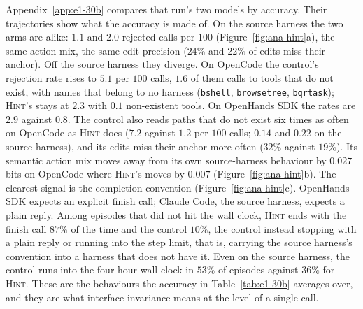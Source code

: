 \documentclass{article} %
\newcommand{\method}{\textsc{Hint}}
\newcommand{\claudecode}{Claude Code}
\newcommand{\opencode}{OpenCode}
\newcommand{\openhands}{OpenHands SDK}   %
\begin{document}
Appendix~\ref{app:e1-30b} compares that run's two models by accuracy. Their
trajectories show what the accuracy is made of. On the source harness the two
arms are alike: $1.1$ and $2.0$ rejected calls per $100$
(Figure~\ref{fig:ana-hint}a), the same action mix, the same edit precision
($24\%$ and $22\%$ of edits miss their anchor). Off the source harness they
diverge. On \opencode{} the control's rejection rate rises to $5.1$ per $100$
calls, $1.6$ of them calls to tools that do not exist, with names that belong
to no harness (\texttt{bshell}, \texttt{browsetree}, \texttt{bqrtask});
\method{}'s stays at $2.3$ with $0.1$ non-existent tools. On \openhands{} the
rates are $2.9$ against $0.8$. The control also reads paths that do not exist
six times as often on \opencode{} as \method{} does ($7.2$ against $1.2$ per
$100$ calls; $0.14$ and $0.22$ on the source harness), and its edits miss
their anchor more often ($32\%$ against $19\%$). Its semantic action mix
moves away from its own source-harness behaviour by $0.027$ bits on
\opencode{} where \method{}'s moves by $0.007$ (Figure~\ref{fig:ana-hint}b).
The clearest signal is the completion convention
(Figure~\ref{fig:ana-hint}c). \openhands{} expects an explicit finish call;
\claudecode{}, the source harness, expects a plain reply. Among episodes that
did not hit the wall clock, \method{} ends with the finish call $87\%$ of the
time and the control $10\%$, the control instead stopping with a plain reply
or running into the step limit, that is, carrying the source harness's
convention into a harness that does not have it. Even on the source harness,
the control runs into the four-hour wall clock in $53\%$ of episodes against
$36\%$ for \method{}. These are the behaviours the accuracy in
Table~\ref{tab:e1-30b} averages over, and they are what interface invariance
means at the level of a single call.
\end{document}
